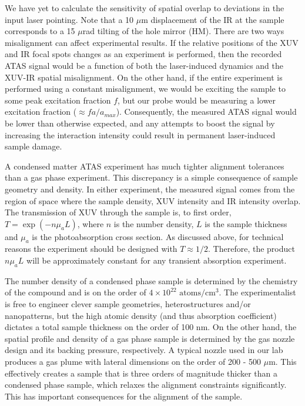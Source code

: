 We have yet to calculate the sensitivity of spatial overlap to deviations in the input laser pointing. Note that a 10 $\mu$m displacement of the IR at the sample corresponds to a 15 $\mu$rad tilting of the hole mirror (HM). There are two ways misalignment can affect experimental results. If the relative positions of the XUV and IR focal spots changes as an experiment is performed, then the recorded ATAS signal would be a function of both the laser-induced dynamics and the XUV-IR spatial misalignment. On the other hand, if the entire experiment is performed using a constant misalignment, we would be exciting the sample to some peak excitation fraction $f$, but our probe would be measuring a lower excitation fraction ($\approx f a / a_{max}$). Consequently, the measured ATAS signal would be lower than otherwise expected, and any attempts to boost the signal by increasing the interaction intensity could result in permanent laser-induced sample damage.

A condensed matter ATAS experiment has much tighter alignment tolerances than a gas phase experiment. This discrepancy is a simple consequence of sample geometry and density. In either experiment, the measured signal comes from the region of space where the sample density, XUV intensity and IR intensity overlap. The transmission of XUV through the sample is, to first order, $T= \exp(- n \mu_a L)$, where $n$ is the number density, $L$ is the sample thickness and $\mu_a$ is the photoabsorption cross section. As discussed above, for technical reasons the experiment should be designed with $T \approx 1/2$. Therefore, the product $n \mu_a L$ will be approximately constant for any transient absorption experiment.

The number density of a condensed phase sample is determined by the chemistry of the compound and is on the order of $4 \times 10^{22} \text{ atoms}/\text{cm}^3$. The experimentalist is free to engineer clever sample geometries, heterostructures and/or nanopatterns, but the high atomic density (and thus absorption coefficient) dictates a total sample thickness on the order of 100 nm. On the other hand, the spatial profile and density of a gas phase sample is determined by the gas nozzle design and its backing pressure, respectively. A typical nozzle used in our lab produces a gas plume with lateral dimensions on the order of 200 - 500 $\mu$m. This effectively creates a sample that is three orders of magnitude thicker than a condensed phase sample, which relaxes the alignment constraints significantly. This has important consequences for the alignment of the sample.

